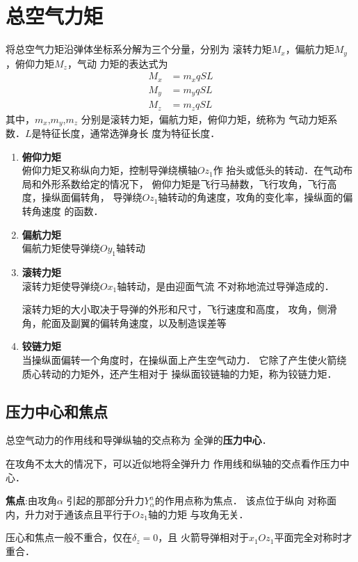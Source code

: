 \section{总空气力矩}
将总空气力矩沿弹体坐标系分解为三个分量，分别为
滚转力矩$M_x$，偏航力矩$M_y$，俯仰力矩$M_z$，气动
力矩的表达式为
\begin{equation*}
  \begin{split}
    M_x&=m_x q S L\\ 
    M_y&=m_y q SL \\ 
    M_z&=m_z q SL 
  \end{split}
\end{equation*}
其中，$m_x $,$m_y $,$m_z $
分别是滚转力矩，偏航力矩，俯仰力矩，统称为
气动力矩系数．$L$是特征长度，通常选弹身长
度为特征长度．
\begin{notice}
\begin{enumerate}
  \item {\bfseries 俯仰力矩}\\ 
    俯仰力矩又称纵向力矩，控制导弹绕横轴$Oz_1$作
    抬头或低头的转动．在气动布局和外形系数给定的情况下，
    俯仰力矩是飞行马赫数，飞行攻角，飞行高度，操纵面偏转角，
    导弹绕$Oz_1$轴转动的角速度，攻角的变化率，操纵面的偏转角速度
    的函数．
  \item {\bfseries 偏航力矩}\\ 
    偏航力矩使导弹绕$Oy_1$轴转动
  \item {\bfseries 滚转力矩}\\ 
    滚转力矩使导弹绕$Ox_1$轴转动，是由迎面气流
    不对称地流过导弹造成的．

    滚转力矩的大小取决于导弹的外形和尺寸，飞行速度和高度，
    攻角，侧滑角，舵面及副翼的偏转角速度，以及制造误差等
  \item {\bfseries 铰链力矩}\\ 
    当操纵面偏转一个角度时，在操纵面上产生空气动力．
    它除了产生使火箭绕质心转动的力矩外，还产生相对于
    操纵面铰链轴的力矩，称为铰链力矩．
\end{enumerate}
\end{notice}
\subsection{压力中心和焦点}
总空气动力的作用线和导弹纵轴的交点称为
全弹的{\bfseries 压力中心}．
\begin{note}
在攻角不太大的情况下，可以近似地将全弹升力
作用线和纵轴的交点看作压力中心．
\end{note}
{\bfseries 焦点}:由攻角$\alpha$
引起的那部分升力$Y^a_\alpha$的作用点称为焦点．
该点位于纵向
对称面内，升力对于通该点且平行于$Oz_1$轴的力矩
与攻角无关．
\begin{note}
压心和焦点一般不重合，仅在$\delta_z=0$，且
火箭导弹相对于$x_1Oz_1$平面完全对称时才重合．
\end{note}
